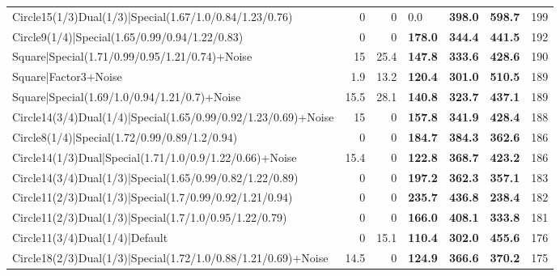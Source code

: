 \begin{tabular}{lrrlllr}
 Circle15(1/3)Dual(1/3)|Special(1.67/1.0/0.84/1.23/0.76)        &          0   &            0   & 0.0            & \textbf{398.0} & \textbf{598.7} &          199 \\
 Circle9(1/4)|Special(1.65/0.99/0.94/1.22/0.83)                 &          0   &            0   & \textbf{178.0} & \textbf{344.4} & \textbf{441.5} &          192 \\
 Square|Special(1.71/0.99/0.95/1.21/0.74)+Noise                 &         15   &           25.4 & \textbf{147.8} & \textbf{333.6} & \textbf{428.6} &          190 \\
 Square|Factor3+Noise                                           &          1.9 &           13.2 & \textbf{120.4} & \textbf{301.0} & \textbf{510.5} &          189 \\
 Square|Special(1.69/1.0/0.94/1.21/0.7)+Noise                   &         15.5 &           28.1 & \textbf{140.8} & \textbf{323.7} & \textbf{437.1} &          189 \\
 Circle14(3/4)Dual(1/4)|Special(1.65/0.99/0.92/1.23/0.69)+Noise &         15   &            0   & \textbf{157.8} & \textbf{341.9} & \textbf{428.4} &          188 \\
 Circle8(1/4)|Special(1.72/0.99/0.89/1.2/0.94)                  &          0   &            0   & \textbf{184.7} & \textbf{384.3} & \textbf{362.6} &          186 \\
 Circle14(1/3)Dual|Special(1.71/1.0/0.9/1.22/0.66)+Noise        &         15.4 &            0   & \textbf{122.8} & \textbf{368.7} & \textbf{423.2} &          186 \\
 Circle14(3/4)Dual(1/3)|Special(1.65/0.99/0.82/1.22/0.89)       &          0   &            0   & \textbf{197.2} & \textbf{362.3} & \textbf{357.1} &          183 \\
 Circle11(2/3)Dual(1/3)|Special(1.7/0.99/0.92/1.21/0.94)        &          0   &            0   & \textbf{235.7} & \textbf{436.8} & \textbf{238.4} &          182 \\
 Circle11(2/3)Dual(1/3)|Special(1.7/1.0/0.95/1.22/0.79)         &          0   &            0   & \textbf{166.0} & \textbf{408.1} & \textbf{333.8} &          181 \\
 Circle11(3/4)Dual(1/4)|Default                                 &          0   &           15.1 & \textbf{110.4} & \textbf{302.0} & \textbf{455.6} &          176 \\
 Circle18(2/3)Dual(1/3)|Special(1.72/1.0/0.88/1.21/0.69)+Noise  &         14.5 &            0   & \textbf{124.9} & \textbf{366.6} & \textbf{370.2} &          175 \\

\end{tabular}
